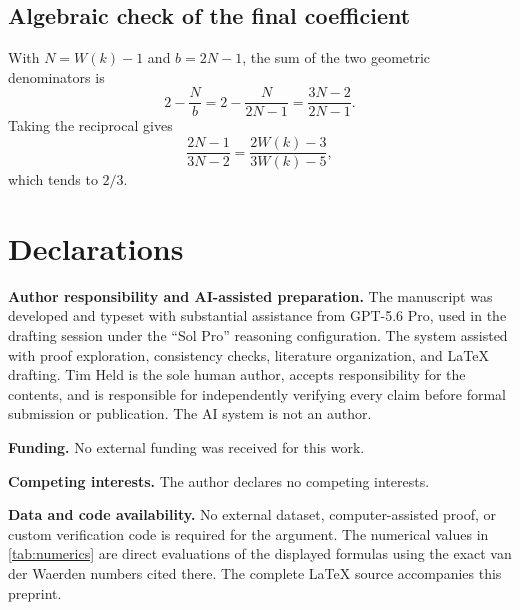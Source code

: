 \documentclass[11pt]{article}
\theoremstyle{definition}
\theoremstyle{remark}
\begin{document}
\subsection{Algebraic check of the final coefficient}

With $N=W(k)-1$ and $b=2N-1$, the sum of the two geometric denominators is
\[
 2-\frac{N}{b}
 =2-\frac{N}{2N-1}
 =\frac{3N-2}{2N-1}.
\]
Taking the reciprocal gives
\[
 \frac{2N-1}{3N-2}
 =\frac{2W(k)-3}{3W(k)-5},
\]
which tends to $2/3$.

\section*{Declarations}

\noindent\textbf{Author responsibility and AI-assisted preparation.}
The manuscript was developed and typeset with substantial assistance from
GPT-5.6 Pro, used in the drafting session under the ``Sol Pro'' reasoning
configuration.  The system assisted with proof exploration, consistency
checks, literature organization, and LaTeX drafting.  Tim Held is the sole
human author, accepts responsibility for the contents, and is responsible
for independently verifying every claim before formal submission or
publication.  The AI system is not an author.

\medskip
\noindent\textbf{Funding.}
No external funding was received for this work.

\medskip
\noindent\textbf{Competing interests.}
The author declares no competing interests.

\medskip
\noindent\textbf{Data and code availability.}
No external dataset, computer-assisted proof, or custom verification code is
required for the argument.  The numerical values in \cref{tab:numerics} are
direct evaluations of the displayed formulas using the exact van der Waerden
numbers cited there.  The complete LaTeX source accompanies this preprint.
\end{document}

